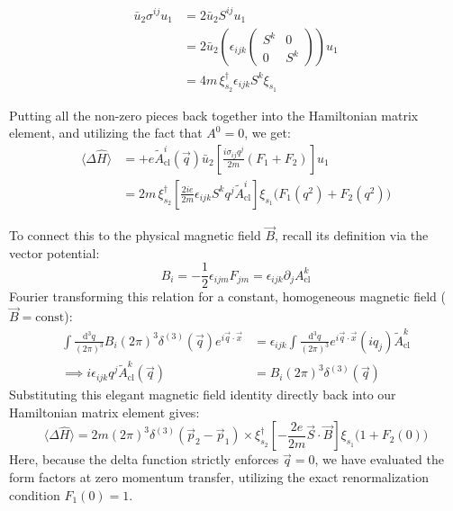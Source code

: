 \[
    \begin{aligned}
        \bar{u}_2 \sigma^{ij} u_1 & = 2 \bar{u}_2 S^{ij} u_1                                                                         \\
                                  & = 2 \bar{u}_2 \left( \epsilon_{ijk} \begin{pmatrix} S^k & 0 \\ 0 & S^k \end{pmatrix} \right) u_1 \\
                                  & = 4 m \, \xi_{s_2}^\dagger \epsilon_{ijk} S^k \xi_{s_1}
    \end{aligned}
\]

Putting all the non-zero pieces back together into the Hamiltonian matrix element, and utilizing the fact that $A^0=0$, we get:
\[
    \begin{aligned}
        \langle \Delta \hat{H} \rangle & = +e \tilde{A}^i_{\text{cl}}(\vec{q}) \bar{u}_2 \left[ \frac{i \sigma_{ij} q^j}{2m} (F_1 + F_2) \right] u_1                                      \\
                                       & = 2m \, \xi_{s_2}^\dagger \left[ \frac{2ie}{2m} \epsilon_{ijk} S^k q^j \tilde{A}^i_{\text{cl}} \right] \xi_{s_1} \big( F_1(q^2) + F_2(q^2) \big)
    \end{aligned}
\]

To connect this to the physical magnetic field $\vec{B}$, recall its definition via the vector potential:
\[
    B_i = -\frac{1}{2} \epsilon_{ijm} F_{jm} = \epsilon_{ijk} \partial_j A^k_{\text{cl}}
\]
Fourier transforming this relation for a constant, homogeneous magnetic field ($\vec{B} = \text{const}$):
\[
    \begin{aligned}
        \int \frac{\mathrm{d}^3 q}{(2\pi)^3} B_i (2\pi)^3 \delta^{(3)}(\vec{q}) e^{i \vec{q} \cdot \vec{x}} & = \epsilon_{ijk} \int \frac{\mathrm{d}^3 q}{(2\pi)^3} e^{i \vec{q} \cdot \vec{x}} (i q_j) \tilde{A}^k_{\text{cl}} \\
        \implies i \epsilon_{ijk} q^j \tilde{A}^k_{\text{cl}}(\vec{q})                                      & = B_i (2\pi)^3 \delta^{(3)}(\vec{q})
    \end{aligned}
\]
Substituting this elegant magnetic field identity directly back into our Hamiltonian matrix element gives:
\[
    \langle \Delta \hat{H} \rangle = 2m (2\pi)^3 \delta^{(3)}(\vec{p}_2 - \vec{p}_1) \times \xi_{s_2}^\dagger \left[ -\frac{2e}{2m} \vec{S} \cdot \vec{B} \right] \xi_{s_1} \big( 1 + F_2(0) \big)
\]
Here, because the delta function strictly enforces $\vec{q}=0$, we have evaluated the form factors at zero momentum transfer, utilizing the exact renormalization condition $F_1(0) = 1$.

